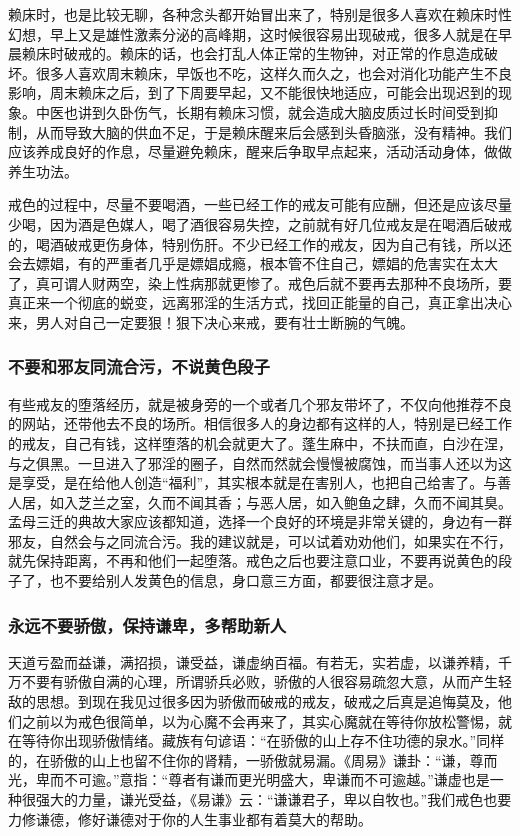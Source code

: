 赖床时，也是比较无聊，各种念头都开始冒出来了，特别是很多人喜欢在赖床时性幻想，早上又是雄性激素分泌的高峰期，这时候很容易出现破戒，很多人就是在早晨赖床时破戒的。赖床的话，也会打乱人体正常的生物钟，对正常的作息造成破坏。很多人喜欢周末赖床，早饭也不吃，这样久而久之，也会对消化功能产生不良影响，周末赖床之后，到了下周要早起，又不能很快地适应，可能会出现迟到的现象。中医也讲到久卧伤气，长期有赖床习惯，就会造成大脑皮质过长时间受到抑制，从而导致大脑的供血不足，于是赖床醒来后会感到头昏脑涨，没有精神。我们应该养成良好的作息，尽量避免赖床，醒来后争取早点起来，活动活动身体，做做养生功法。

戒色的过程中，尽量不要喝酒，一些已经工作的戒友可能有应酬，但还是应该尽量少喝，因为酒是色媒人，喝了酒很容易失控，之前就有好几位戒友是在喝酒后破戒的，喝酒破戒更伤身体，特别伤肝。不少已经工作的戒友，因为自己有钱，所以还会去嫖娼，有的严重者几乎是嫖娼成瘾，根本管不住自己，嫖娼的危害实在太大了，真可谓人财两空，染上性病那就更惨了。戒色后就不要再去那种不良场所，要真正来一个彻底的蜕变，远离邪淫的生活方式，找回正能量的自己，真正拿出决心来，男人对自己一定要狠！狠下决心来戒，要有壮士断腕的气魄。

\subsubsection{不要和邪友同流合污，不说黄色段子}

有些戒友的堕落经历，就是被身旁的一个或者几个邪友带坏了，不仅向他推荐不良的网站，还带他去不良的场所。相信很多人的身边都有这样的人，特别是已经工作的戒友，自己有钱，这样堕落的机会就更大了。蓬生麻中，不扶而直，白沙在涅，与之俱黑。一旦进入了邪淫的圈子，自然而然就会慢慢被腐蚀，而当事人还以为这是享受，是在给他人创造“福利”，其实根本就是在害别人，也把自己给害了。与善人居，如入芝兰之室，久而不闻其香；与恶人居，如入鲍鱼之肆，久而不闻其臭。孟母三迁的典故大家应该都知道，选择一个良好的环境是非常关键的，身边有一群邪友，自然会与之同流合污。我的建议就是，可以试着劝劝他们，如果实在不行，就先保持距离，不再和他们一起堕落。戒色之后也要注意口业，不要再说黄色的段子了，也不要给别人发黄色的信息，身口意三方面，都要很注意才是。

\subsubsection{永远不要骄傲，保持谦卑，多帮助新人}

天道亏盈而益谦，满招损，谦受益，谦虚纳百福。有若无，实若虚，以谦养精，千万不要有骄傲自满的心理，所谓骄兵必败，骄傲的人很容易疏忽大意，从而产生轻敌的思想。到现在我见过很多因为骄傲而破戒的戒友，破戒之后真是追悔莫及，他们之前以为戒色很简单，以为心魔不会再来了，其实心魔就在等待你放松警惕，就在等待你出现骄傲情绪。藏族有句谚语：“在骄傲的山上存不住功德的泉水。”同样的，在骄傲的山上也留不住你的肾精，一骄傲就易漏。《周易》谦卦：“谦，尊而光，卑而不可逾。”意指：“尊者有谦而更光明盛大，卑谦而不可逾越。”谦虚也是一种很强大的力量，谦光受益，《易谦》云：“谦谦君子，卑以自牧也。”我们戒色也要力修谦德，修好谦德对于你的人生事业都有着莫大的帮助。

